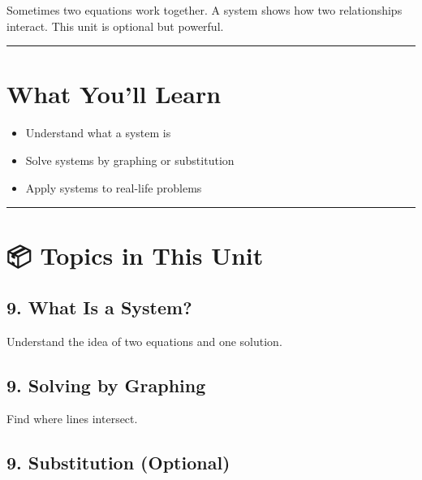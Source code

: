 \documentclass[
  letterpaper,
  DIV=11,
  numbers=noendperiod]{scrreprt}
\providecommand{\tightlist}{%
  \setlength{\itemsep}{0pt}\setlength{\parskip}{0pt}}
\begin{document}
Sometimes two equations work together. A system shows how two
relationships interact. This unit is optional but powerful.

\begin{center}\rule{0.5\linewidth}{0.5pt}\end{center}

\section*{What You'll Learn}\label{what-youll-learn-8}


\begin{itemize}
\tightlist
\item
  Understand what a system is
\item
  Solve systems by graphing or substitution
\item
  Apply systems to real-life problems
\end{itemize}

\begin{center}\rule{0.5\linewidth}{0.5pt}\end{center}

\section*{📦 Topics in This Unit}\label{topics-in-this-unit-8}


\subsection*{9. What Is a System?}\label{what-is-a-system}

Understand the idea of two equations and one solution.

\subsection*{9. Solving by Graphing}\label{solving-by-graphing}

Find where lines intersect.

\subsection*{9. Substitution (Optional)}\label{substitution-optional}
\end{document}
